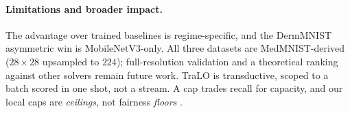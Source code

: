 \documentclass[letterpaper]{article} %
\begin{document}
\paragraph{Limitations and broader impact.}
The advantage over trained baselines is regime-specific, and the DermMNIST asymmetric win
is MobileNetV3-only. All three datasets are MedMNIST-derived ($28{\times}28$ upsampled to
$224$); full-resolution validation and a theoretical ranking against other solvers remain
future work. TraLO is transductive, scoped to a batch scored in one shot, not a stream. A
cap trades recall for capacity, and our local caps are \emph{ceilings}, not
fairness \emph{floors} \citep{hardt2016equality}.

{\small
}

\end{document}
